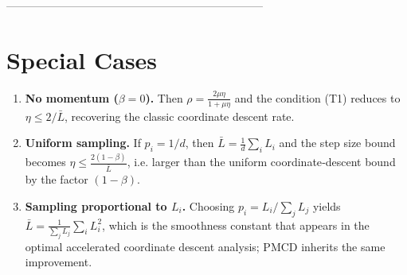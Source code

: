 \documentclass{article}
\begin{document}
---------------------------------------------------------------------

\section*{Special Cases}
\begin{enumerate}[label=\arabic*.]
\item \textbf{No momentum ($\beta=0$).}  
Then $\rho=\frac{2\mu\eta}{1+\mu\eta}$ and the condition (T1) reduces to
$\eta\le 2/\bar L$, recovering the classic coordinate descent rate.
\item \textbf{Uniform sampling.}  
If $p_i=1/d$, then $\bar L=\frac{1}{d}\sum_i L_i$ and the step size bound
becomes $\eta\le \frac{2(1-\beta)}{\bar L}$, i.e. larger than the uniform
coordinate‑descent bound by the factor $(1-\beta)$.
\item \textbf{Sampling proportional to $L_i$.}  
Choosing $p_i=L_i/\sum_j L_j$ yields $\bar L=\frac{1}{\sum_j L_j}\sum_i L_i^{2}$,
which is the smoothness constant that appears in the optimal accelerated
coordinate descent analysis; PMCD inherits the same improvement.
\end{enumerate}
\end{document}
